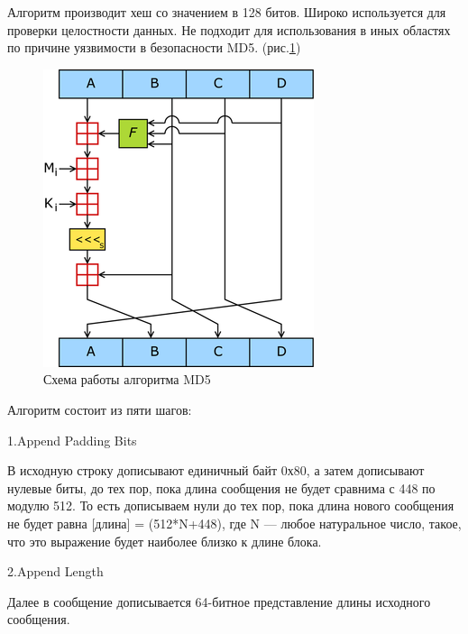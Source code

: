 \documentclass[a4paper, 12pt, oneside]{scrartcl}
\begin{document}
	Алгоритм производит хеш со значением в 128 битов. Широко используется для проверки целостности данных.
	Не подходит для использования в иных областях по причине уязвимости в безопасности MD5. (рис.\ref{fig:key})
	\begin{figure}[h!]
		\centering
		\includegraphics[scale=0.9]{MD5}
		\caption{Схема работы алгоритма MD5}
		\label{fig:key}
	\end{figure}
	\par
	Алгоритм состоит из пяти шагов:\par
	1.Append Padding Bits\par
	В исходную строку дописывают единичный байт 0х80, а затем дописывают нулевые биты, до тех пор, пока длина сообщения не будет сравнима с 448 по модулю 512.
	То есть дописываем нули до тех пор, пока длина нового сообщения не будет равна [длина] = (512*N+448), где N — любое натуральное число, такое, что это выражение будет наиболее близко к длине блока.
	
	2.Append Length\par
	Далее в сообщение дописывается 64-битное представление длины исходного сообщения.
	
\end{document}
